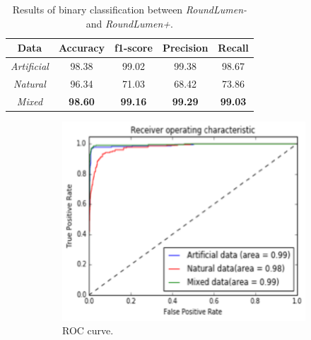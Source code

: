 \begin{table}[ht!]
\centering
\caption{Results of binary classification between \textit{RoundLumen-} and \textit{RoundLumen+}.}
\begin{tabular}{ | c | c | c | c | c |} 
\hline
Data & Accuracy & f1-score & Precision & Recall \\ 
\hline
\textit{Artificial} & 98.38 & 99.02 & 99.38 & 98.67 \\ 
\hline
\textit{Natural} & 96.34& 71.03& 68.42& 73.86 \\
\hline
\textit{Mixed} & \textbf{98.60} &  \textbf{99.16} & \textbf{99.29} & \textbf{99.03} \\
\hline
\end{tabular}
\label{table:results1}
\end{table}


\begin{figure}[ht!]
    \centering
    \begin{subfigure}[t]{0.5\textwidth}
     \centering
       \includegraphics[width=1.0\linewidth]{img/roundlumens_ROC.pdf}
  \caption{ROC curve.}
        \label{fig:ROC2}   
    \end{subfigure}%
    \begin{subfigure}[t]{0.5\textwidth}
       \centering

\end{subfigure}
\end{figure}
